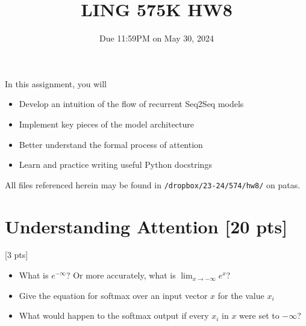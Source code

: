 \documentclass[11pt]{article}
\begin{document}
\title{LING 575K HW8}
\date{\vspace{-0.2in}Due 11:59PM on May 30, 2024}
\maketitle


\noindent In this assignment, you will 
\begin{itemize}
  \item Develop an intuition of the flow of recurrent Seq2Seq models
  \item Implement key pieces of the model architecture
  \item Better understand the formal process of attention
  \item Learn and practice writing useful Python docstrings
\end{itemize}
All files referenced herein may be found in \texttt{/dropbox/23-24/574/hw8/} on patas.


\section{Understanding Attention [20 pts]}

 \hfill [3 pts]
\begin{itemize}
  \item What is $e^{-\infty}$? Or more accurately, what is $\lim_{x \to -\infty} e^x$?
  \item Give the equation for softmax over an input vector $x$ for the value $x_i$
  \item What would happen to the softmax output if every $x_i$ in $x$ were set to $-\infty$?
\end{itemize}
\end{document}
